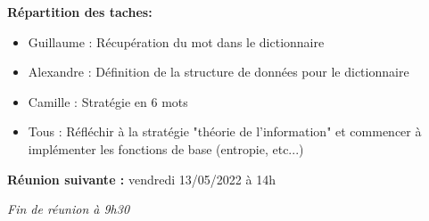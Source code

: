 \documentclass[12pt,a4paper,final]{report}
\begin{document}
\begin{flushleft}
    \textbf{Répartition des taches:}
\end{flushleft}
\begin{itemize}
    \item Guillaume : Récupération du mot dans le dictionnaire
    \item Alexandre : Définition de la structure de données pour le dictionnaire
    \item Camille : Stratégie en 6 mots
    \item Tous : Réfléchir à la stratégie "théorie de l'information" et commencer à implémenter les fonctions de base (entropie, etc...) 
\end{itemize}

\begin{flushleft}
    \textbf{Réunion suivante :} vendredi 13/05/2022 à 14h
\end{flushleft}

\textit{Fin de réunion à 9h30}
\end{document}
